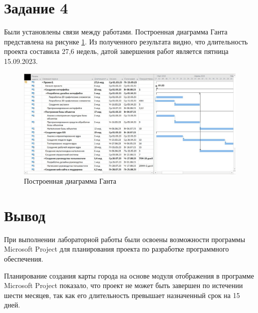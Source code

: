 \section*{Задание 4}

Были установлены связи между работами. Построенная диаграмма Ганта представлена на рисунке \ref{img:task4}. Из полученного результата видно, что длительность проекта составила 27,6 недель, датой завершения работ является пятница 15.09.2023.

\begin{figure}[H]
	\begin{center}
		\includegraphics[scale=0.5]{inc/img/task4.jpg}
	\end{center}
	\captionsetup{justification=centering}
	\caption{Построенная диаграмма Ганта}
	\label{img:task4}
\end{figure}

\section*{Вывод}

При выполнении лабораторной работы были освоены возможности программы Microsoft Project для планирования проекта по разработке программного обеспечения.

Планирование создания карты города на основе модуля отображения в программе Microsoft Project показало, что проект не может быть завершен по истечении шести месяцев, так как его длительность превышает назначенный срок на 15 дней.
